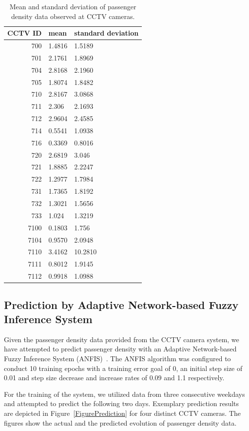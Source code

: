 \begin{table}
\begin{center}
\caption{Mean and standard deviation of passenger density data observed at CCTV cameras.}
\label{tablePassengerDensity}
\begin{tabular}{r|ll}
CCTV ID & mean & standard deviation\\\hline
 700 & 1.4816 & 1.5189\\
 701 & 2.1761& 1.8969 \\
704 & 2.8168 & 2.1960\\
705 & 1.8074& 1.8482\\
710 & 2.8167& 3.0868\\
711 & 2.306& 2.1693\\
712 & 2.9604& 2.4585\\
714 & 0.5541& 1.0938 \\
716 & 0.3369& 0.8016\\
720 & 2.6819& 3.046 \\
721 & 1.8885& 2.2247\\
722 & 1.2977& 1.7984\\
731 & 1.7365& 1.8192 \\
732 & 1.3021& 1.5656\\
733 & 1.024& 1.3219\\
7100 & 0.1803& 1.756 \\
7104 & 0.9570& 2.0948\\
7110 & 3.4162& 10.2810\\
7111 & 0.8012& 1.9145\\
7112 & 0.9918& 1.0988\\\hline
\end{tabular}
\end{center}
\end{table}
\pagebreak

\subsection{Prediction by Adaptive Network-based Fuzzy Inference System}
Given the passenger density data provided from the CCTV camera system, we have attempted to predict passenger density with an Adaptive Network-based Fuzzy Inference System (ANFIS)~\cite{Prediction_Jang_1993}.
The ANFIS algorithm was configured to conduct 10 training epochs with a training error goal of 0, an initial step size of 0.01 and step size decrease and increase rates of 0.09 and 1.1 respectively. 

For the training of the system, we utilized data from three consecutive weekdays and attempted to predict the following two days. 
Exemplary prediction results are depicted in Figure~\ref{FigurePrediction} for four distinct CCTV cameras.
The figures show the actual and the predicted evolution of passenger density data.

